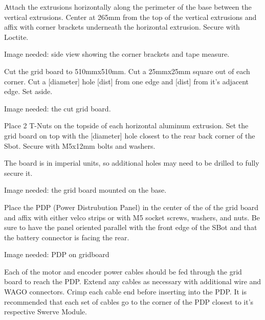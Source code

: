 Attach the extrusions horizontally along the perimeter of the base
between the vertical extrusions. Center at 265mm from the top of the
vertical extrusions and affix with corner brackets underneath the
horizontal extrusion. Secure with Loctite.

\begin{tipbox}
Image needed: side view showing the corner brackets and tape measure.
\end{tipbox}

Cut the grid board to 510mmx510mm. Cut a 25mmx25mm square out of each
corner. Cut a [diameter] hole [dist] from one edge and [dist] from it's adjacent edge. Set aside.

\begin{tipbox}
Image needed: the cut grid board.
\end{tipbox}

Place 2 T-Nuts on the topside of each horizontal aluminum extrusion. Set
the grid board on top with the [diameter] hole closest to the rear back corner of the Sbot. Secure with M5x12mm bolts and washers.

\begin{tipbox}
The board is in imperial units, so additional holes may need to be
drilled to fully secure it.
\end{tipbox}

\begin{tipbox}
Image needed: the grid board mounted on the base.
\end{tipbox}

Place the PDP (Power Distrubution Panel) in the center of the of the grid board and affix with either velco strips or with M5 socket screws, washers, and nuts. Be sure to have the panel oriented parallel with the front edge of the SBot and that the battery connector is facing the rear.

\begin{tipbox}
Image needed: PDP on gridboard
\end{tipbox}

Each of the motor and encoder power cables should be fed through the grid board to reach the PDP. Extend any cables as necessary with additional wire and WAGO connectors. Crimp each cable end before inserting into the PDP. It is recommended that each set of cables go to the corner of the PDP closest to it's respective Swerve Module.

